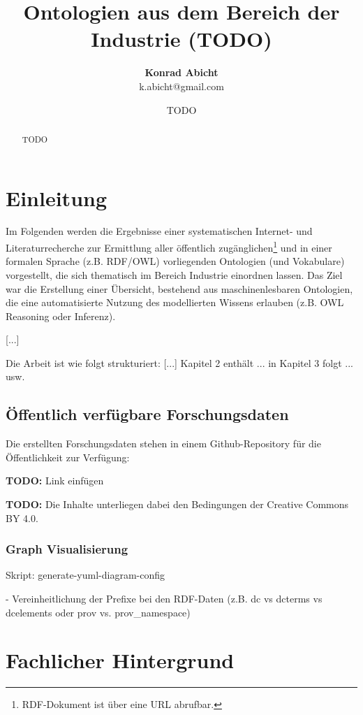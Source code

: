 \documentclass{article}
\title{Ontologien aus dem Bereich der Industrie (TODO)}
\author{\textbf{Konrad Abicht} \\ k.abicht@gmail.com}
\date{TODO}
\begin{document}
\maketitle

\begin{abstract}
    TODO
\end{abstract}

\section{Einleitung}

Im Folgenden werden die Ergebnisse einer systematischen Internet- und Literaturrecherche zur Ermittlung aller öffentlich zugänglichen\footnote{RDF-Dokument ist über eine URL abrufbar.} und in einer formalen Sprache (z.B. RDF/OWL) vorliegenden Ontologien (und Vokabulare) vorgestellt, die sich thematisch im Bereich Industrie einordnen lassen.
Das Ziel war die Erstellung einer Übersicht, bestehend aus maschinenlesbaren Ontologien, die eine automatisierte Nutzung des modellierten Wissens erlauben (z.B. OWL Reasoning oder Inferenz).

[...]

Die Arbeit ist wie folgt strukturiert: [...] Kapitel 2 enthält ... in Kapitel 3 folgt ... usw.

\subsection{Öffentlich verfügbare Forschungsdaten}

Die erstellten Forschungsdaten stehen in einem Github-Repository für die Öffentlichkeit zur Verfügung:

\textbf{TODO:} Link einfügen

\textbf{TODO:} Die Inhalte unterliegen dabei den Bedingungen der Creative Commons BY 4.0.

\subsubsection{Graph Visualisierung}

Skript: generate-yuml-diagram-config

- Vereinheitlichung der Prefixe bei den RDF-Daten (z.B. dc vs dcterms vs dcelements oder prov vs. prov\_namespace)

\section{Fachlicher Hintergrund}
\end{document}

